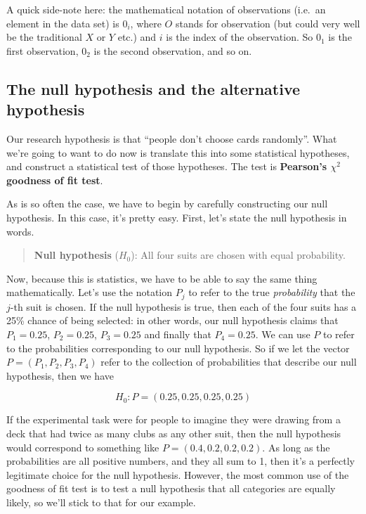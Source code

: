 \documentclass[
  11pt,
  a4paper,
  twoside,symmetric,openright]{book}
\theoremstyle{break}
\theoremstyle{break}
\begin{document}
A quick side-note here: the mathematical notation of observations (i.e.~an element in the data set) is \(0_i\), where \(O\) stands for observation (but could very well be the traditional \(X\) or \(Y\) etc.) and \(i\) is the index of the observation. So \(0_1\) is the first observation, \(0_2\) is the second observation, and so on.

\subsection{The null hypothesis and the alternative hypothesis}\label{the-null-hypothesis-and-the-alternative-hypothesis}

Our research hypothesis is that ``people don't choose cards randomly''. What we're going to want to do now is translate this into some statistical hypotheses, and construct a statistical test of those hypotheses. The test is \textbf{Pearson's \(\chi^2\) goodness of fit test}.

As is so often the case, we have to begin by carefully constructing our null hypothesis. In this case, it's pretty easy. First, let's state the null hypothesis in words.

\begin{quote}
\textbf{Null hypothesis} (\(H_0\)): All four suits are chosen with equal probability.
\end{quote}

Now, because this is statistics, we have to be able to say the same thing mathematically. Let's use the notation \(P_j\) to refer to the true \emph{probability} that the \(j\)-th suit is chosen. If the null hypothesis is true, then each of the four suits has a 25\% chance of being selected: in other words, our null hypothesis claims that \(P_1 = 0.25\), \(P_2 = 0.25\), \(P_3 = 0.25\) and finally that \(P_4 = 0.25\). We can use \(P\) to refer to the probabilities corresponding to our null hypothesis. So if we let the vector \(P = (P_1, P_2, P_3, P_4)\) refer to the collection of probabilities that describe our null hypothesis, then we have

\[
H_0: {P} = (0.25, 0.25, 0.25, 0.25)
\]

If the experimental task were for people to imagine they were drawing from a deck that had twice as many clubs as any other suit, then the null hypothesis would correspond to something like \(P = (0.4, 0.2, 0.2, 0.2)\). As long as the probabilities are all positive numbers, and they all sum to 1, then it's a perfectly legitimate choice for the null hypothesis. However, the most common use of the goodness of fit test is to test a null hypothesis that all categories are equally likely, so we'll stick to that for our example.
\end{document}

